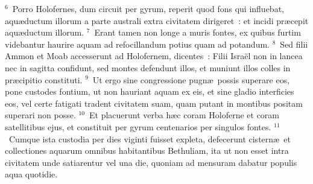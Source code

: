 ${}^{6}$~Porro Holofernes, dum circuit per gyrum, reperit quod fons qui influebat, aqu\ae ductum illorum a parte australi extra civitatem dirigeret~: et incidi pr\ae cepit aqu\ae ductum illorum.
${}^{7}$~Erant tamen non longe a muris fontes, ex quibus furtim videbantur haurire aquam ad refocillandum potius quam ad potandum.
${}^{8}$~Sed filii Ammon et Moab accesserunt ad Holofernem, dicentes~: Filii Isra\"el non in lancea nec in sagitta confidunt, sed montes defendunt illos, et muniunt illos colles in pr\ae cipitio constituti.
${}^{9}$~Ut ergo sine congressione pugn\ae\ possis superare eos, pone custodes fontium, ut non hauriant aquam ex eis, et sine gladio interficies eos, vel certe fatigati tradent civitatem suam, quam putant in montibus positam superari non posse.
${}^{10}$~Et placuerunt verba h\ae c coram Holoferne et coram satellitibus ejus, et constituit per gyrum centenarios per singulos fontes.
${}^{11}$~Cumque ista custodia per dies viginti fuisset expleta, defecerunt cistern\ae\ et collectiones aquarum omnibus habitantibus Bethuliam, ita ut non esset intra civitatem unde satiarentur vel una die, quoniam ad mensuram dabatur populis aqua quotidie.


